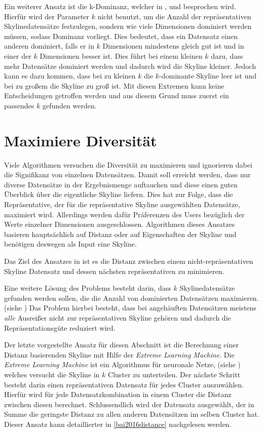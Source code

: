 Ein weiterer Ansatz ist die k-Dominanz, welcher in \cite{Chan:2006:FKS:1142473.1142530}, \cite{Chan:2006:HDS:2117976.2118017} und \cite{5480364} besprochen wird. Hierfür wird der Parameter $k$ nicht benutzt, um die Anzahl der repräsentativen Skylinedatensätze festzulegen, sondern wie viele Dimensionen dominiert werden müssen, sodass Dominanz vorliegt. Dies bedeutet, dass ein Datensatz einen anderen dominiert, falls er  in $k$ Dimensionen mindestens gleich gut ist und in einer der $k$ Dimensionen besser ist. Dies führt bei einem kleinen $k$ dazu, dass mehr Datensätze dominiert werden und dadurch wird die Skyline kleiner. Jedoch kann es dazu kommen, dass bei zu kleinen $k$ die $k$-dominante Skyline leer ist und bei zu großem die Skyline zu groß ist. Mit diesen Extremen kann keine Entscheidungen getroffen werden und aus diesem Grund muss zuerst ein passendes $k$ gefunden werden.
\section{Maximiere Diversität}
\label{ch:Forschungsstand:sec:maxDiv}
Viele Algorithmen versuchen die Diversität zu maximieren und ignorieren dabei die Signifikanz von einzelnen Datensätzen. Damit soll erreicht werden, dass nur diverse Datensätze in der Ergebnismenge auftauchen und diese einen guten Überblick über die eigentliche Skyline liefern.
Dies hat zur Folge, dass die Repräsentative, der für die repräsentative Skyline ausgewählten Datensätze, maximiert wird. Allerdings werden dafür Präferenzen des Users bezüglich der Werte einzelner Dimensionen ausgeschlossen. Algorithmen dieses Ansatzes basieren hauptsächlich auf Distanz oder auf Eigenschaften der Skyline und benötigen deswegen als Input eine Skyline. 

Das Ziel des Ansatzes in \cite{Tao:2009:DRS:1546683.1547325} ist es die Distanz zwischen einem nicht-repräsentativen Skyline Datensatz und dessen nächsten repräsentativen zu minimieren. 

Eine weitere Lösung des Problems besteht darin, dass $k$ Skylinedatensätze gefunden werden sollen, die die Anzahl von dominierten Datensätzen maximieren. (siehe \cite{4221657}) Das Problem hierbei besteht, dass bei angehäuften Datensätzen meistens \textit{alle} Ausreißer nicht zur repräsentativen Skyline gehören und dadurch die Repräsentationsgüte reduziert wird.

Der letzte vorgestellte Ansatz für diesen Abschnitt ist die Berechnung einer Distanz basierenden Skyline mit Hilfe der \textit{Extreme Learning Machine}. Die \textit{Extreme Learning Machine} ist ein Algorithmus für neuronale Netze, (siehe \cite{huang2006extreme}) welches versucht die Skyline in $k$ Cluster zu unterteilen. Der nächste Schritt besteht darin einen repräsentativen Datensatz für jedes Cluster auszuwählen. Hierfür wird für jede Datensatzkombination in einem Cluster die Distanz zwischen diesen berechnet. Schlussendlich wird der Datensatz ausgewählt, der in Summe die geringste Distanz zu allen anderen Datensätzen im selben Cluster hat. Dieser Ansatz kann detaillierter in \ref{bai2016distance} nachgelesen werden.
